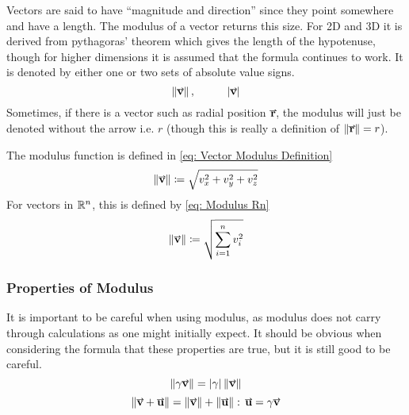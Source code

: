 \documentclass[main.tex]{subfiles}
\begin{document}
                Vectors are said to have ``magnitude and direction'' since they point somewhere and have a length. The modulus of a vector returns this size. For 2D and 3D it is derived from  pythagoras' theorem which gives the length of the hypotenuse, though for higher dimensions it is assumed that the formula continues to work.
                It is denoted by either one or two sets of absolute value signs.
                \begin{equation*}
                    \left\|\vect{v}\right\|, \hspace{10mm} |\vect{v}|
                \end{equation*}
                Sometimes, if there is a vector such as radial position $\vect{r}$, the modulus will just be denoted without the arrow i.e. $r$ (though this is really a definition of $\vmod{\vect{r}}=r$).
                \vspace{1em}
                
                The modulus function is defined in \eqref{eq: Vector Modulus Definition}
                \begin{equation}
                    \vmod{\vect{v}} \deq \sqrt{v_x^2 + v_y^2 + v_z^2}
                    \label{eq: Vector Modulus Definition}
                \end{equation}
                For vectors in $\mathbb{R}^n$, this is defined by \eqref{eq: Modulus Rn}
                \begin{equation}
                    \vmod{\vect{v}} \deq \sqrt{\sum_{i=1}^n v_i^2}
                    \label{eq: Modulus Rn}
                \end{equation}

                \subsubsection{Properties of Modulus}
                    \label{subsubsec: Properties of Modulus}

                    It is important to be careful when using modulus, as modulus does not carry through calculations as one might initially expect. It should be obvious when considering the formula that these properties are true, but it is still good to be careful.
                    \begin{equation}
                        \vmod{\gamma \vect{v}} = |\gamma| \vmod{\vect{v}}
                    \end{equation}
                    \begin{equation}
                        \vmod{\vect{v} + \vect{u}} = \vmod{\vect{v}} + \vmod{\vect{u}} : \, \vect{u} = \gamma \vect{v}
                        \label{eq: Modulus Addition Inequality}
                    \end{equation}
\end{document}
